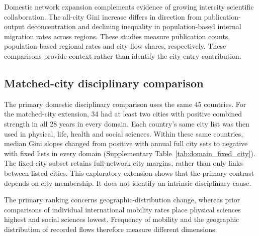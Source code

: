 Domestic network expansion complements evidence of growing intercity scientific collaboration\cite{ref016}. The all-city Gini increase differs in direction from publication-output deconcentration\cite{ref015} and declining inequality in population-based internal migration rates across regions\cite{ref029}. These studies measure publication counts, population-based regional rates and city flow shares, respectively. These comparisons provide context rather than identify the city-entry contribution.

\subsection{Matched-city disciplinary comparison}
\label{supp:domain_cities}

The primary domestic disciplinary comparison uses the same 45 countries. For the matched-city extension, 34 had at least two cities with positive combined strength in all 28 years in every domain. Each country's same city list was then used in physical, life, health and social sciences. Within these same countries, median Gini slopes changed from positive with annual full city sets to negative with fixed lists in every domain (Supplementary Table~\ref{tab:domain_fixed_city}). The fixed-city subset retains full-network city margins, rather than only links between listed cities. This exploratory extension shows that the primary contrast depends on city membership. It does not identify an intrinsic disciplinary cause.

The primary ranking concerns geographic-distribution change, whereas prior comparisons of individual international mobility rates place physical sciences highest and social sciences lowest\cite{ref033}. Frequency of mobility and the geographic distribution of recorded flows therefore measure different dimensions.
\clearpage
